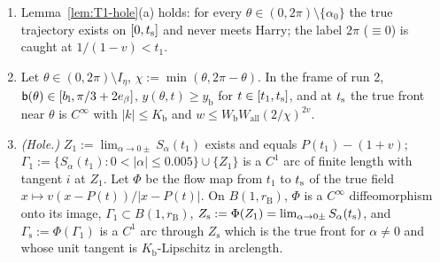 \begin{lemma}\label{lem:HTp-bulk}
\begin{enumerate}
\item[(a)] Lemma~\ref{lem:T1-hole}(a) holds: for every $\theta\in(0,2\pi)\setminus\{\alpha_0\}$ the true trajectory exists on $[0,t_{\mathrm s}]$ and
never meets Harry; the label $2\pi$ ($\equiv0$) is caught at $1/(1-v)<t_1$.
\item[(b)] Let $\theta\in(0,2\pi)\setminus I_\eta$, $\chi:=\min(\theta,2\pi-\theta)$. In the frame of run 2,
$\mathsf b(\theta)\in[b_{\mathrm l},\pi/3+2e_\beta]$, $y(\theta,t)\ge y_{\mathrm b}$ for $t\in[t_1,t_{\mathrm s}]$, and at $t_{\mathrm s}$ the true front near
$\theta$ is $C^\infty$ with $|k|\le K_{\mathrm b}$ and $w\le W_{\mathrm b}W_{\mathrm{all}}(2/\chi)^{2v}$.
\item[(c)] \emph{(Hole.)} $Z_1:=\lim_{\alpha\to0\pm}S_\alpha(t_1)$ exists and equals $P(t_1)-(1+v)$; $\Gamma_1:=\{S_\alpha(t_1):0<|\alpha|\le0.005\}
\cup\{Z_1\}$ is a $C^1$ arc of finite length with tangent $i$ at $Z_1$. Let $\Phi$ be the flow map from $t_1$ to $t_{\mathrm s}$ of the true field
$x\mapsto v(x-P(t))/|x-P(t)|$. On $B(1,r_{\mathrm B})$, $\Phi$ is a $C^\infty$ diffeomorphism onto its image, $\Gamma_1\subset
B(1,r_{\mathrm B})$, $Z_{\mathrm s}:=\Phi(Z_1)=\lim_{\alpha\to0\pm}S_\alpha(t_{\mathrm s})$, and $\Gamma_{\mathrm s}:=\Phi(\Gamma_1)$ is a $C^1$ arc
through $Z_{\mathrm s}$ which is the true front for $\alpha\ne0$ and whose unit tangent is $K_{\mathrm b}$-Lipschitz in arclength.
\end{enumerate}
\end{lemma}
